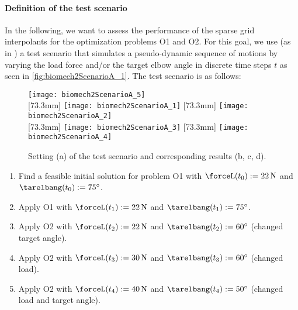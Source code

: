 \paragraph{Definition of the test scenario}

In the following, we want to assess the performance
of the sparse grid interpolants for the optimization problems O1 and O2.
For this goal, we use (as in \cite{Valentin18Gradient}) a test scenario
that simulates a pseudo-dynamic sequence of motions
by varying the load force and/or the target elbow angle
in discrete time steps $t$ as seen in \cref{fig:biomech2ScenarioA_1}.
The test scenario is as follows:
%
\begin{figure}
  \texttt{[image: biomech2ScenarioA\_5]}%
  \\[2mm]%
  [73.3mm]{%
    \hspace*{3.3mm}%
    \texttt{[image: biomech2ScenarioA\_1]}%
    \hspace*{3.6mm}%
  }%
  \hfill%
  [73.3mm]{%
    \hspace*{2.0mm}%
    \texttt{[image: biomech2ScenarioA\_2]}%
    \hspace*{9.5mm}%
  }%
  \\[1mm]%
  [73.3mm]{%
    \texttt{[image: biomech2ScenarioA\_3]}%
  }%
  \hfill%
  [73.3mm]{%
    \texttt{[image: biomech2ScenarioA\_4]}%
  }%
  \caption[Settings and results of the test scenario]{%
    Setting (a) of the test scenario and corresponding results (b, c, d).%
  }%
  \label{fig:biomech2ScenarioA}%
\end{figure}
%
\begin{enumerate}
  \item
  Find a feasible initial solution for problem O1
  with $\forceL(t_0) := \SI{22}{\newton}$ and
  $\tarelbang(t_0) := \ang{75}$.
  
  \item
  Apply O1 with $\forceL(t_1) := \SI{22}{\newton}$ and
  $\tarelbang(t_1) := \ang{75}$.
  
  \item
  Apply O2 with $\forceL(t_2) := \SI{22}{\newton}$ and
  $\tarelbang(t_2) := \ang{60}$ (changed target angle).
  
  \item
  Apply O2 with $\forceL(t_3) := \SI{30}{\newton}$ and
  $\tarelbang(t_3) := \ang{60}$ (changed load).
  
  \item
  Apply O2 with $\forceL(t_4) := \SI{40}{\newton}$ and
  $\tarelbang(t_4) := \ang{50}$ (changed load and target angle).
\end{enumerate}
